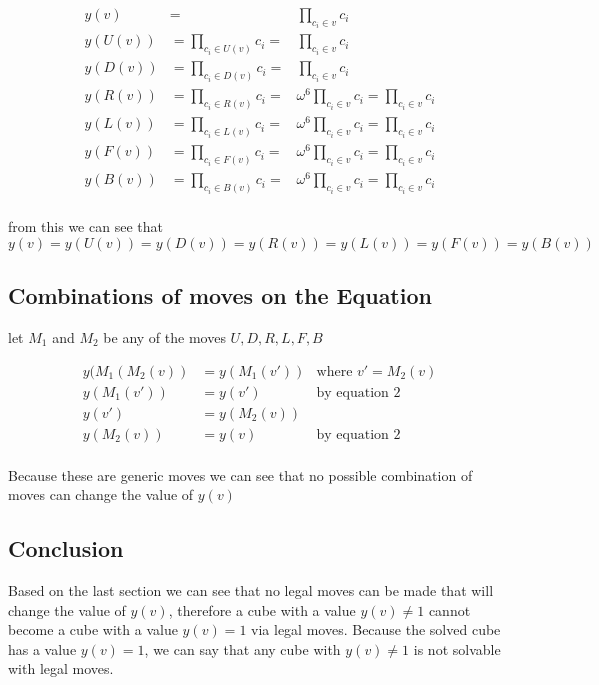 \documentclass{article}
\begin{document}
\begin{align*}
y(v) &= &\prod_{c_i \in v} c_i \\
y(U(v)) &= \prod_{c_i \in U(v)}c_i= &\prod_{c_i \in v} c_i\\
y(D(v)) &= \prod_{c_i \in D(v)}c_i= &\prod_{c_i \in v} c_i\\
y(R(v)) &= \prod_{c_i \in R(v)}c_i= &\omega^6 \prod_{c_i \in v} c_i = \prod_{c_i \in v} c_i\\
y(L(v)) &= \prod_{c_i \in L(v)}c_i= &\omega^6 \prod_{c_i \in v} c_i =\prod_{c_i \in v} c_i\\
y(F(v)) &= \prod_{c_i \in F(v)}c_i= &\omega^6 \prod_{c_i \in v} c_i =\prod_{c_i \in v} c_i\\
y(B(v)) &= \prod_{c_i \in B(v)}c_i= &\omega^6 \prod_{c_i \in v} c_i =\prod_{c_i \in v} c_i\\
\end{align*}
\vspace{5mm}

from this we can see that\\ 
\begin{equation}
y(v) = y(U(v)) =y(D(v)) =y(R(v)) =y(L(v)) =y(F(v)) =y(B(v))
\end{equation}


\subsection{Combinations of moves on the Equation}
let $M_1$ and $M_2$ be any of the moves ${U,D,R,L,F,B}$

\begin{align*}
y(M_1(M_2(v))&= y(M_1(v')) &\text{where } v'=M_2(v)\\
y(M_1(v')) &= y(v') &\text{by equation 2}\\
y(v')&= y(M_2(v))\\
y(M_2(v)) &= y(v) &\text{by equation 2}\\
\end{align*}

Because these are generic moves we can see that no possible combination of moves can change the value of $y(v)$

\subsection{Conclusion}
Based on the last section we can see that no legal moves can be made that will change the value of $y(v)$, therefore a cube with a value $y(v) \neq 1$ cannot become a cube with a value $y(v) =1$ via legal moves. Because the solved cube has a value $y(v)=1$, we can say that any cube with $y(v) \neq 1$ is not solvable with legal moves. 
\end{document}
